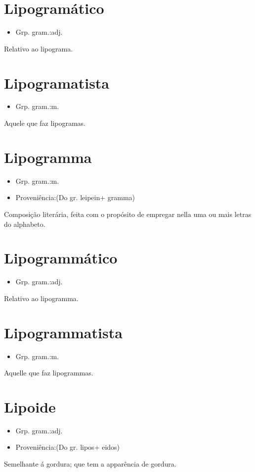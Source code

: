 \section{Lipogramático}
\begin{itemize}
\item {Grp. gram.:adj.}
\end{itemize}
Relativo ao lipograma.
\section{Lipogramatista}
\begin{itemize}
\item {Grp. gram.:m.}
\end{itemize}
Aquele que faz lipogramas.
\section{Lipogramma}
\begin{itemize}
\item {Grp. gram.:m.}
\end{itemize}
\begin{itemize}
\item {Proveniência:(Do gr. \textunderscore leipein\textunderscore  + \textunderscore gramma\textunderscore )}
\end{itemize}
Composição literária, feita com o propósito de empregar nella uma ou mais letras do alphabeto.
\section{Lipogrammático}
\begin{itemize}
\item {Grp. gram.:adj.}
\end{itemize}
Relativo ao lipogramma.
\section{Lipogrammatista}
\begin{itemize}
\item {Grp. gram.:m.}
\end{itemize}
Aquelle que faz lipogrammas.
\section{Lipoide}
\begin{itemize}
\item {Grp. gram.:adj.}
\end{itemize}
\begin{itemize}
\item {Proveniência:(Do gr. \textunderscore lipos\textunderscore  + \textunderscore eidos\textunderscore )}
\end{itemize}
Semelhante á gordura; que tem a apparência de gordura.
